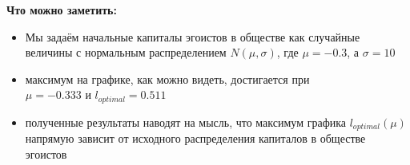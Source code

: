 \documentclass{article}
\begin{document}
\begin{conclusion}
\textbf{Что можно заметить:}
\begin{itemize}
	\item Мы задаём начальные капиталы эгоистов в обществе как случайные величины с нормальным распределением $N\left(\mu, \sigma \right) $, где $\mu = -0.3$, а $\sigma = 10$
	\item максимум на графике, как можно видеть, достигается при \\ $\mu = -0.333$ и $l_{optimal} = 0.511$
	\item полученные результаты наводят на мысль, что максимум графика $l_{optimal}(\mu)$ напрямую зависит от исходного распределения капиталов в обществе эгоистов
\end{itemize}
\end{conclusion}
\null\newpage
\end{document}
